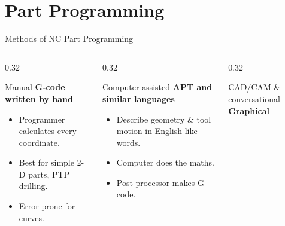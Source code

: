 \documentclass[aspectratio=169]{beamer}
\begin{document}
	\section{Part Programming}
	\begin{frame}{Methods of NC Part Programming}
		\begin{columns}[T]
			\begin{column}{0.32\textwidth}
				\begin{block}{Manual}
					\centering
					\textbf{G-code written by hand}

					\vspace{0.2cm}

					\begin{itemize}\small
						\item Programmer calculates every coordinate.
						\item Best for simple 2-D parts, PTP drilling.
						\item Error-prone for curves.
					\end{itemize}
				\end{block}
			\end{column}
			\begin{column}{0.32\textwidth}
				\begin{block}{Computer-assisted}
					\centering
					\textbf{APT and similar languages}

					\vspace{0.2cm}

					\begin{itemize}\small
						\item Describe geometry \& tool motion in English-like words.
						\item Computer does the maths.
						\item Post-processor makes G-code.
					\end{itemize}
				\end{block}
			\end{column}
			\begin{column}{0.32\textwidth}
				\begin{block}{CAD/CAM \& conversational}
					\centering
					\textbf{Graphical}

					\vspace{0.2cm}


\end{block}
\end{column}
\end{columns}
\end{frame}
\end{document}
